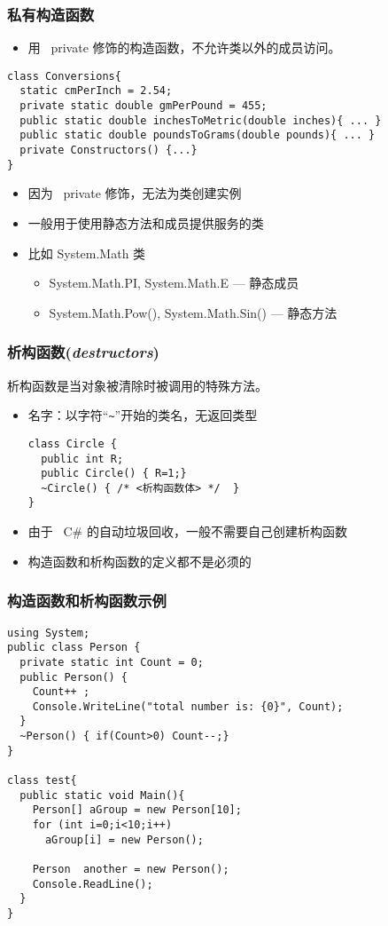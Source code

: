 \begin{frame}[fragile]
\frametitle{私有构造函数}
\begin{itemize}
\item 用 ~private 修饰的构造函数，不允许类以外的成员访问。
\end{itemize}
\begin{lstlisting}
class Conversions{
  static cmPerInch = 2.54;
  private static double gmPerPound = 455;
  public static double inchesToMetric(double inches){ ... }
  public static double poundsToGrams(double pounds){ ... }
  private Constructors() {...}
}
\end{lstlisting}
\pause
\begin{itemize}
\item 因为 ~private 修饰，无法为类创建实例
\item 一般用于使用静态方法和成员提供服务的类
\pause
\item 比如 System.Math 类
\begin{itemize}
\item System.Math.PI, System.Math.E   --- 静态成员
\item System.Math.Pow(), System.Math.Sin() --- 静态方法
\end{itemize}
\end{itemize}

\end{frame}


\begin{frame}[fragile]
\frametitle{析构函数(\textit{destructors})}
析构函数是当对象被清除时被调用的特殊方法。
\begin{itemize}
\item 名字：以字符“\verb|~|”开始的类名，无返回类型
\begin{lstlisting}[escapeinside=<>]
class Circle {
  public int R;
  public Circle() { R=1;}
  ~Circle() { /* <析构函数体> */  }
}
\end{lstlisting}
  \pause
\item 由于 ~C\# 的自动垃圾回收，一般不需要自己创建析构函数
  \pause
\item 构造函数和析构函数的定义都不是必须的
\end{itemize}
\end{frame}

\begin{frame}
\frametitle{构造函数和析构函数示例}
\begin{lstlisting}
using System;
public class Person {
  private static int Count = 0;
  public Person() {
    Count++ ;
    Console.WriteLine("total number is: {0}", Count);
  }
  ~Person() { if(Count>0) Count--;}
}

class test{
  public static void Main(){
    Person[] aGroup = new Person[10];
    for (int i=0;i<10;i++)
      aGroup[i] = new Person();

    Person  another = new Person();
    Console.ReadLine();
  }
}

\end{lstlisting}
\end{frame}



